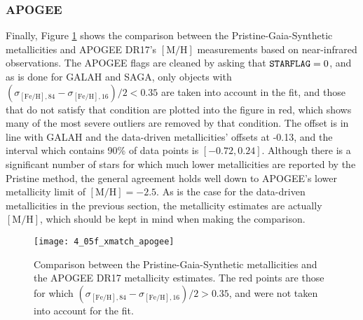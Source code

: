 \documentclass[a4paper,11pt]{article}
\begin{document}
\subsubsection*{APOGEE}
Finally, Figure \ref{fig:xmatch_apogee} shows the comparison between the Pristine-Gaia-Synthetic metallicities and APOGEE DR17's $\mathrm{[M/H]}$ measurements based on near-infrared observations. The APOGEE flags are cleaned by asking that $\mathrm{{\tt STARFLAG}}=0$, and as is done for GALAH and SAGA, only objects with $(\sigma_{\mathrm{[Fe/H]},84}-\sigma_{\mathrm{[Fe/H]},16})/2<0.35$ are taken into account in the fit, and those that do not satisfy that condition are plotted into the figure in red, which shows many of the most severe outliers are removed by that condition. The offset is in line with GALAH and the data-driven metallicities' offsets at -0.13, and the interval which contains 90\% of data points is $[-0.72,0.24]$. Although there is a significant number of stars for which much lower metallicities are reported by the Pristine method, the general agreement holds well down to APOGEE's lower metallicity limit of $\mathrm{[M/H]}=-2.5$. As is the case for the data-driven metallicities in the previous section, the metallicity estimates are actually $\mathrm{[M/H]}$, which should be kept in mind when making the comparison.
%
\begin{figure}[ht]
 \centering
 \texttt{[image: 4\_05f\_xmatch\_apogee]}
 \caption[Metallicity comparison to APOGEE DR17]{Comparison between the Pristine-Gaia-Synthetic metallicities and the APOGEE DR17 metallicity estimates. The red points are those for which $(\sigma_{\mathrm{[Fe/H]},84}-\sigma_{\mathrm{[Fe/H]},16})/2>0.35$, and were not taken into account for the fit.}
 \label{fig:xmatch_apogee}
\end{figure}
%
\end{document}
